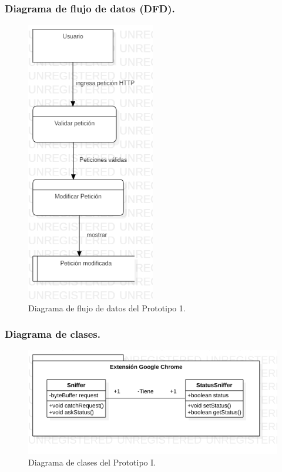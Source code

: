 \documentclass[12pt, a4paper, titlepage]{article}
\begin{document}
			\subsubsection{Diagrama de flujo de datos (DFD).}
    			\begin{figure}[!htb]
    			    \begin{center}
    			        \includegraphics[width=0.5\textwidth]{imagenes/DFD_P1.png}
    			        \caption{Diagrama de flujo de datos del Prototipo 1.}
    				\end{center}
    			\end{figure}
			   
			\subsubsection{Diagrama de clases.}
				\begin{figure}[!htb]
					\begin{center}
						\includegraphics[width=13cm]{./imagenes/DC_P1.png}
						\caption{Diagrama de clases del Prototipo I.}
					\end{center}
				\end{figure}\newpage
				
\end{document}
